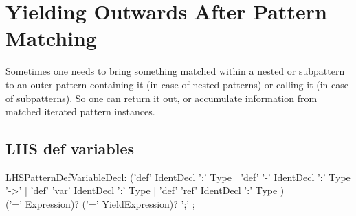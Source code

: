 
\section{Yielding Outwards After Pattern Matching} 

Sometimes one needs to bring something matched within a nested or subpattern to an outer pattern containing it (in case of nested patterns) or calling it (in case of subpatterns).
So one can return it out, or accumulate information from matched iterated pattern instances. 

\subsection{LHS def variables} 

\begin{rail} 
  LHSPatternDefVariableDecl: 
	('def' IdentDecl ':' Type |
	'def' '-' IdentDecl ':' Type '->' |
	'def' 'var' IdentDecl ':' Type |
	'def' 'ref' IdentDecl ':' Type ) \\
	('=' Expression)? ('=' YieldExpression)? ';'
	;
\end{rail}

